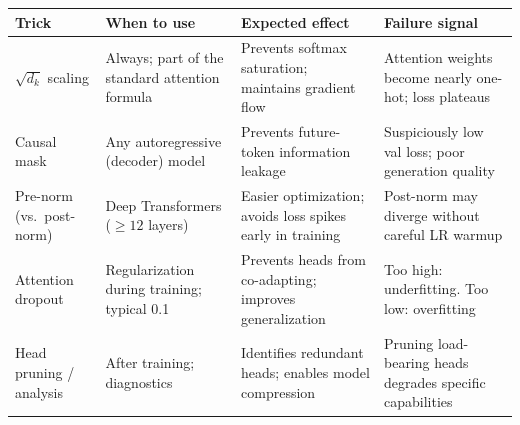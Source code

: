 \noindent
\begin{tabularx}{\textwidth}{@{}>{\raggedright\arraybackslash}p{2.8cm}
                              >{\raggedright\arraybackslash}p{2.8cm}
                              >{\raggedright\arraybackslash}p{3.2cm}
                              X@{}}
\toprule
\textbf{Trick} & \textbf{When to use} & \textbf{Expected effect} & \textbf{Failure signal} \\
\midrule
$\sqrt{d_k}$ scaling &
  Always; part of the standard attention formula &
  Prevents softmax saturation; maintains gradient flow &
  Attention weights become nearly one-hot; loss plateaus \\[4pt]
Causal mask &
  Any autoregressive (decoder) model &
  Prevents future-token information leakage &
  Suspiciously low val loss; poor generation quality \\[4pt]
Pre-norm (vs.\ post-norm) &
  Deep Transformers ($\geq 12$ layers) &
  Easier optimization; avoids loss spikes early in training &
  Post-norm may diverge without careful LR warmup \\[4pt]
Attention dropout &
  Regularization during training; typical 0.1 &
  Prevents heads from co-adapting; improves generalization &
  Too high: underfitting. Too low: overfitting \\[4pt]
Head pruning / analysis &
  After training; diagnostics &
  Identifies redundant heads; enables model compression &
  Pruning load-bearing heads degrades specific capabilities \\
\bottomrule
\end{tabularx}


